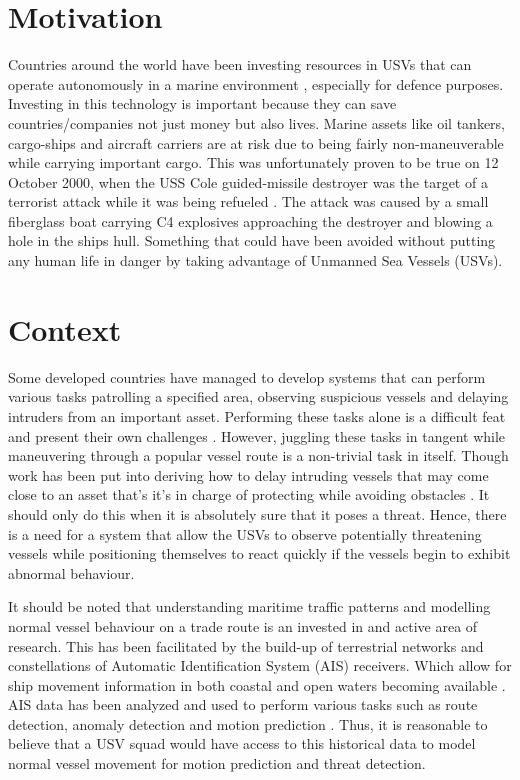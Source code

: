 \documentclass[bsc,frontabs,twoside,singlespacing,parskip,deptreport]{infthesis}     %
\begin{document}
\section{Motivation}
Countries around the world have been investing resources in USVs that can operate autonomously in a marine environment \cite{usvcase}, especially for defence purposes.  Investing in this technology is important because they can save countries/companies not just money but also lives. Marine assets like oil tankers, cargo-ships and aircraft carriers are at risk due to being fairly non-maneuverable while carrying important cargo. This was unfortunately proven to be true on 12 October 2000, when the USS Cole guided-missile destroyer was the target of a terrorist attack while it was being refueled \cite{combs2009encyclopedia}. The attack was caused by a small fiberglass boat carrying C4 explosives approaching the destroyer and blowing a hole in the ships hull. Something that could have been avoided without putting any human life in danger by taking advantage of Unmanned Sea Vessels (USVs). 

\section{Context}
Some developed countries have managed to develop systems that can perform various tasks patrolling a specified area, observing suspicious vessels and delaying intruders from an important asset. Performing these tasks alone is a difficult feat and present their own challenges \cite{usvcase}\cite{wolf2017caracas}\cite{raboin2013model}. However, juggling these tasks in tangent while maneuvering through a popular vessel route is a non-trivial task in itself. Though work has been put into deriving how to delay intruding vessels that may come close to an asset that's it's in charge of protecting \cite{raboin2013model} while avoiding obstacles \cite{gupta2015block}\cite{marzoughi2018collision}. It should only do this when it is absolutely sure that it poses a threat. Hence, there is a need for a system that allow the USVs to observe potentially threatening vessels while positioning themselves to react quickly if the vessels begin to exhibit abnormal behaviour.

It should be noted that understanding maritime traffic patterns and modelling normal vessel behaviour on a trade route is an invested in and active area of research. This has been facilitated by the build-up of terrestrial networks and constellations of Automatic Identification System (AIS) receivers. Which allow for ship movement information in both coastal and open waters becoming available \cite{perez2009automatic}. AIS data has been analyzed and used to perform various tasks such as route detection, anomaly detection and motion prediction\cite{pallotta2013vessel} \cite{ristic2008statistical} \cite{kowalska2012maritime}.  
Thus, it is reasonable to believe that a USV squad would have access to this historical data to model normal vessel movement for motion prediction and threat detection.
\end{document}
